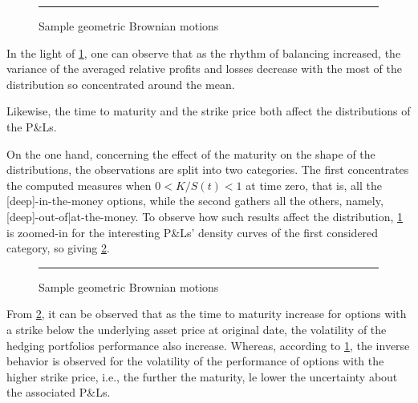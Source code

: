 \documentclass[12pt]{report}
\begin{document}
\begin{figure}[h]
  \centering
  \rule{40mm}{20mm}
  \caption{Sample geometric Brownian motions}
  \label{p:analysis:mjd:pl:dist:big}
\end{figure}
         

In the light of \cref{p:analysis:mjd:pl:dist:big}, one can observe that as the rhythm of balancing increased, the variance of the averaged relative profits and losses decrease with the most of the distribution so concentrated around the mean.

Likewise,  the time to maturity and the strike price both affect the distributions of the P\&Ls.
%

On the one hand, concerning the effect of the maturity on the shape of the distributions, the observations are split into two categories.
The first concentrates the computed measures when $0 < K/S(t) < 1$ at time zero, that is, all the [deep]-in-the-money options, while the second gathers all the others, namely, [deep]-out-of|at-the-money. 
To observe how such results affect the distribution, \cref{p:analysis:mjd:pl:dist:big} is zoomed-in for the interesting P\&Ls' density curves of the first considered category, so giving \cref{p:analysis:mjd:pl:dist:in}.


\begin{figure}[h]
  \centering
  \rule{40mm}{20mm}
  \caption{Sample geometric Brownian motions}
  \label{p:analysis:mjd:pl:dist:in}
\end{figure}

From \cref{p:analysis:mjd:pl:dist:in}, it can be observed that as the time to maturity increase for options with a strike below the underlying asset price at original date, the volatility of the hedging portfolios performance also increase.
Whereas, according to \cref{p:analysis:mjd:pl:dist:big}, the inverse behavior is observed for the volatility of the performance of options with the higher strike price, i.e., the further the maturity, le lower the uncertainty about the associated P\&Ls.
\end{document}
